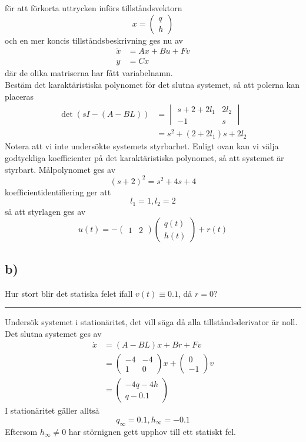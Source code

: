 \documentclass[12pt]{article}
\newcommand{\qline}{\hrule \vspace*{10pt}}
\begin{document}
för att förkorta uttrycken införs tillståndsvektorn 
\[x = \begin{pmatrix}
q \\
h
\end{pmatrix}\]
och en mer koncis tillståndsbeskrivning ges nu av 
\begin{align*}
  \dot{x} &= Ax + Bu + Fv \\
  y &= Cx
\end{align*}
där de olika matriserna har fått variabelnamn. \\

Bestäm det karaktäristiska polynomet för det slutna systemet, så att polerna kan placeras
\begin{align*}
  \det{(sI-(A-BL))} &= \begin{vmatrix}
s + 2 + 2l_1 & 2l_2 \\
-1 & s
  \end{vmatrix} \\
&= s^2 + (2+2l_1)s + 2l_2
\end{align*}
Notera att vi inte undersökte systemets styrbarhet. Enligt ovan kan vi välja godtyckliga koefficienter på det karaktäristiska polynomet, så att systemet är styrbart. Målpolynomet ges av 
\[(s+2)^2 = s^2 + 4s + 4\]
koefficientidentifiering ger att 
\[l_1 = 1, l_2 = 2\]
så att styrlagen ges av 
\[u(t) = -\begin{pmatrix}
1 & 2
\end{pmatrix}\begin{pmatrix}
q(t) \\
h(t)
\end{pmatrix} + r(t)\]

\subsection*{b)}
Hur stort blir det statiska felet ifall $v(t) \equiv 0.1$, då $r = 0$?
\qline
Undersök systemet i stationäritet, det vill säga då alla tillståndsderivator är noll. Det slutna systemet ges av 
\begin{align*}
  \dot{x} &= (A-BL)x + Br + Fv \\
  &= \begin{pmatrix}
-4 & -4 \\
1 & 0
  \end{pmatrix}x + \begin{pmatrix}
0 \\
-1
  \end{pmatrix}v \\
&= \begin{pmatrix}
-4q-4h \\
q-0.1
\end{pmatrix}
\end{align*}
I stationäritet gäller alltså 
\[q_{\infty} = 0.1, h_{\infty} = -0.1\]
Eftersom $h_{\infty} \neq 0$ har störnignen gett upphov till ett statiskt fel.
\end{document}
